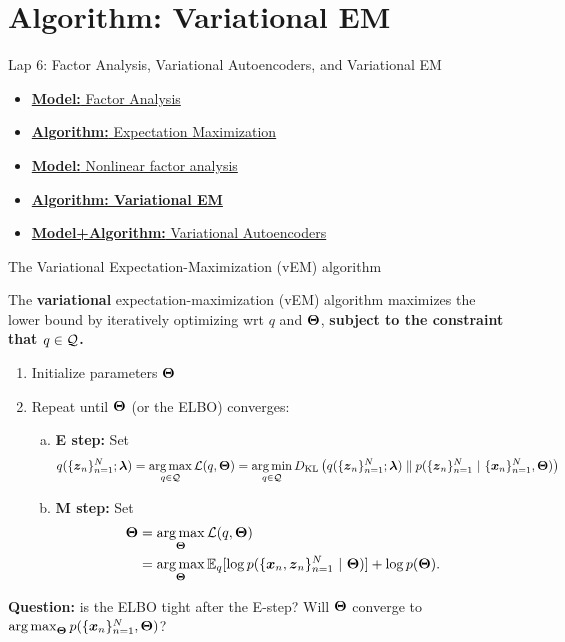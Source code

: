 \documentclass[aspectratio=169]{beamer}
\begin{document}
\section{Algorithm: Variational EM}
\label{sec:vem}

\begin{frame}{Lap 6: Factor Analysis, Variational Autoencoders, and Variational EM}
\begin{itemize}
    \item \hyperref[sec:fa]{\textbf{Model:} Factor Analysis}
    \item \hyperref[sec:em]{\textbf{Algorithm:} Expectation Maximization}
    \item \hyperref[sec:vaes]{\textbf{Model:} Nonlinear factor analysis}
    \item \hyperref[sec:vem]{\textbf{Algorithm: Variational EM}}
    \item \hyperref[sec:vaes]{\textbf{Model+Algorithm:} Variational Autoencoders}
\end{itemize}
\end{frame}


\begin{frame}{The Variational Expectation-Maximization (vEM) algorithm}

The \textbf{variational} expectation-maximization (vEM) algorithm maximizes the lower bound by iteratively optimizing wrt $q$ and $\boldsymbol{\Theta}$, \textbf{subject to the constraint that $q \in \mathcal{Q}$.}

\begin{enumerate}
    \item Initialize parameters $\boldsymbol{\Theta}$
    \item Repeat until $\boldsymbol{\Theta}$ (or the ELBO) converges:
    \begin{enumerate}[a.]
        \item \textbf{E step: } Set
        \begin{align}
            q(\{\boldsymbol{z}_n\}_{n=1}^N; \boldsymbol{\lambda}) = \operatorname*{arg\,max}_{q \in \mathcal{Q}} \mathcal{L}(q, \boldsymbol{\Theta}) = \operatorname*{arg\,min}_{q \in \mathcal{Q}} D_{\textrm{KL}}\left(q(\{\boldsymbol{z}_n\}_{n=1}^N; \boldsymbol{\lambda})\;\|\;p(\{\boldsymbol{z}_n\}_{n=1}^N ~\vert~ \{\boldsymbol{x}_n\}_{n=1}^N, \boldsymbol{\Theta})\right)
        \end{align}
        \item \textbf{M step: } Set 
        \begin{align}
            \boldsymbol{\Theta} &= \operatorname*{arg\,max}_{\boldsymbol{\Theta}} \mathcal{L}(q, \boldsymbol{\Theta}) \\
            &= \operatorname*{arg\,max}_{\boldsymbol{\Theta}} \mathbb{E}_q[\log p(\{\boldsymbol{x}_n, \boldsymbol{z}_n\}_{n=1}^N ~\vert~ \boldsymbol{\Theta})] + \log p(\boldsymbol{\Theta}).
        \end{align}
    \end{enumerate}
\end{enumerate}
\textbf{Question:} is the ELBO tight after the E-step? Will $\boldsymbol{\Theta}$ converge to $\operatorname*{arg\,max}_{\boldsymbol{\Theta}} p(\{\boldsymbol{x}_n\}_{n=1}^N, \boldsymbol{\Theta})$?
\end{frame}
\end{document}
